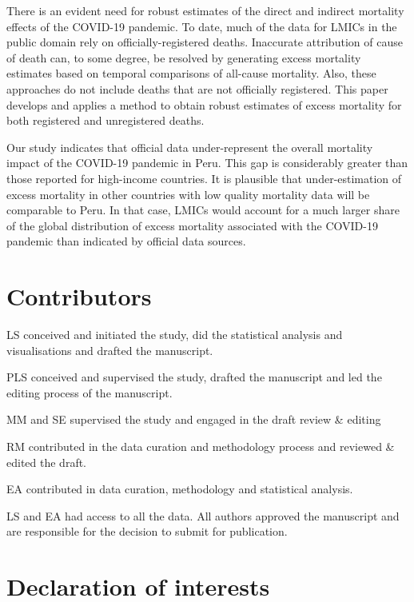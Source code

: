 \documentclass[
]{article}
\begin{document}
There is an evident need for robust estimates of the direct and indirect mortality effects of the COVID-19 pandemic. To date, much of the data for LMICs in the public domain rely on officially-registered deaths. Inaccurate attribution of cause of death can, to some degree, be resolved by generating excess mortality estimates based on temporal comparisons of all-cause mortality. Also, these approaches do not include deaths that are not officially registered. This paper develops and applies a method to obtain robust estimates of excess mortality for both registered and unregistered deaths.

Our study indicates that official data under-represent the overall mortality impact of the COVID-19 pandemic in Peru. This gap is considerably greater than those reported for high-income countries. It is plausible that under-estimation of excess mortality in other countries with low quality mortality data will be comparable to Peru. In that case, LMICs would account for a much larger share of the global distribution of excess mortality associated with the COVID-19 pandemic than indicated by official data sources.

\hypertarget{contributors}{%
\section{Contributors}\label{contributors}}

LS conceived and initiated the study, did the statistical analysis and visualisations and drafted the manuscript.

PLS conceived and supervised the study, drafted the manuscript and led the editing process of the manuscript.

MM and SE supervised the study and engaged in the draft review \& editing

RM contributed in the data curation and methodology process and reviewed \& edited the draft.

EA contributed in data curation, methodology and statistical analysis.

LS and EA had access to all the data. All authors approved the manuscript and are responsible for the decision to submit for publication.

\hypertarget{declaration-of-interests}{%
\section{Declaration of interests}\label{declaration-of-interests}}
\end{document}
